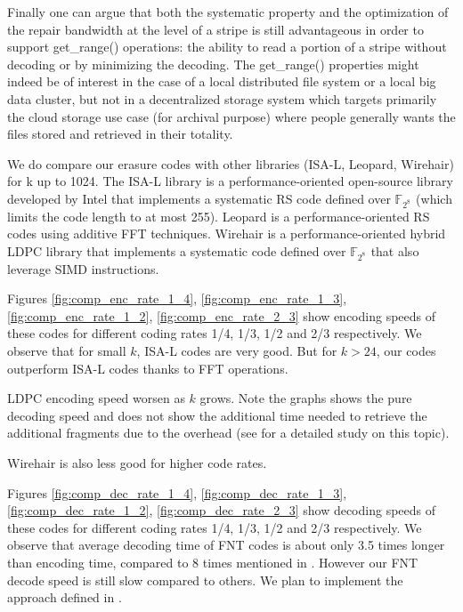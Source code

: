 \documentclass[oneside,9pt]{article}
\newcommand{\gf}[2][]{ \mathbb{F}_{{#2}^{#1}} }
\begin{document}
Finally one can argue that both the systematic property and the optimization of the repair bandwidth at the level of a stripe is still advantageous in order to support get\_range() operations: the ability to read a portion of a stripe without decoding or by minimizing the decoding. The get\_range() properties might indeed be of interest in the case of a local distributed file system or a local big data cluster, but not in a decentralized storage system which targets primarily the cloud storage use case (for archival purpose) where people generally wants the files stored and retrieved in their totality.

We do compare our erasure codes with other libraries (ISA-L, Leopard, Wirehair) for k up to 1024. The ISA-L library \cite{isal} is a performance-oriented open-source library developed by Intel that implements a systematic RS code defined over $\gf{2^8}$ (which limits the code length to at most 255). Leopard \cite{leopard} is a performance-oriented RS codes using additive FFT techniques. Wirehair \cite{wirehair} is a performance-oriented hybrid LDPC library that implements a systematic code defined over $\gf{2^8}$ that also leverage SIMD instructions.

Figures \ref{fig:comp_enc_rate_1_4}, \ref{fig:comp_enc_rate_1_3}, \ref{fig:comp_enc_rate_1_2}, \ref{fig:comp_enc_rate_2_3} show encoding speeds of these codes for different coding rates 1/4, 1/3, 1/2 and 2/3 respectively. We observe that for small $k$, ISA-L codes are very good. But for $k > 24$, our codes outperform ISA-L codes thanks to FFT operations. 

LDPC encoding speed worsen as $k$ grows. Note the graphs shows the pure decoding speed and does not show the additional time needed to retrieve the additional fragments due to the overhead (see \cite{plank_ldpc} for a detailed study on this topic).

Wirehair is also less good for higher code rates.

Figures \ref{fig:comp_dec_rate_1_4}, \ref{fig:comp_dec_rate_1_3}, \ref{fig:comp_dec_rate_1_2}, \ref{fig:comp_dec_rate_2_3} show decoding speeds of these codes for different coding rates 1/4, 1/3, 1/2 and 2/3 respectively. We observe that average decoding time of FNT codes is about only 3.5 times longer than encoding time, compared to 8 times mentioned in \cite{fnt_lacan}. However our FNT decode speed is still slow compared to others. We plan to implement the approach defined in \cite{fnt_ida}.
\end{document}
